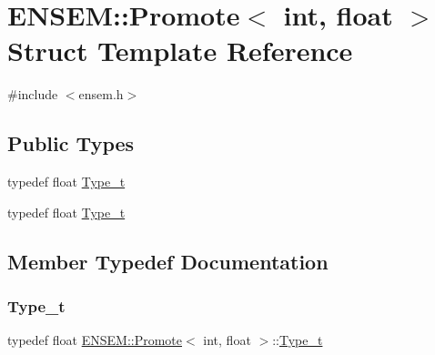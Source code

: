 \hypertarget{structENSEM_1_1Promote_3_01int_00_01float_01_4}{}\section{E\+N\+S\+EM\+:\+:Promote$<$ int, float $>$ Struct Template Reference}
\label{structENSEM_1_1Promote_3_01int_00_01float_01_4}


{\ttfamily \#include $<$ensem.\+h$>$}

\subsection*{Public Types}
\begin{DoxyCompactItemize}
\item 
typedef float \mbox{\hyperlink{structENSEM_1_1Promote_3_01int_00_01float_01_4_af9c8f66593ece7d87835891df1c0d7e4}{Type\+\_\+t}}
\item 
typedef float \mbox{\hyperlink{structENSEM_1_1Promote_3_01int_00_01float_01_4_af9c8f66593ece7d87835891df1c0d7e4}{Type\+\_\+t}}
\end{DoxyCompactItemize}


\subsection{Member Typedef Documentation}
\mbox{\label{structENSEM_1_1Promote_3_01int_00_01float_01_4_af9c8f66593ece7d87835891df1c0d7e4}} 
\subsubsection{\texorpdfstring{Type\_t}{Type\_t}\hspace{0.1cm}{\footnotesize\ttfamily [1/2]}}
{\footnotesize\ttfamily typedef float \mbox{\hyperlink{structENSEM_1_1Promote}{E\+N\+S\+E\+M\+::\+Promote}}$<$ int, float $>$\+::\mbox{\hyperlink{structENSEM_1_1Promote_3_01int_00_01float_01_4_af9c8f66593ece7d87835891df1c0d7e4}{Type\+\_\+t}}}

\mbox{\label{structENSEM_1_1Promote_3_01int_00_01float_01_4_af9c8f66593ece7d87835891df1c0d7e4}} 
